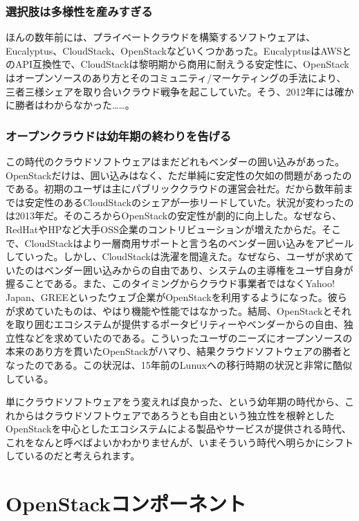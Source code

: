 \documentclass[9pt,b5paper,tombo,openany]{jsbook}
\begin{document}
\subsubsection{選択肢は多様性を産みすぎる}

ほんの数年前には、プライベートクラウドを構築するソフトウェアは、Eucalyptus、CloudStack、OpenStackなどいくつかあった。EucalyptusはAWSとのAPI互換性で、CloudStackは黎明期から商用に耐えうる安定性に、OpenStackはオープンソースのあり方とそのコミュニティ/マーケティングの手法により、三者三様シェアを取り合いクラウド戦争を起こしていた。そう、2012年には確かに勝者はわからなかった……。

\subsubsection{オープンクラウドは幼年期の終わりを告げる}

この時代のクラウドソフトウェアはまだどれもベンダーの囲い込みがあった。OpenStackだけは、囲い込みはなく、ただ単純に安定性の欠如の問題があったのである。初期のユーザは主にパブリッククラウドの運営会社だ。だから数年前までは安定性のあるCloudStackのシェアが一歩リードしていた。状況が変わったのは2013年だ。そのころからOpenStackの安定性が劇的に向上した。なぜなら、RedHatやHPなど大手OSS企業のコントリビューションが増えたからだ。そこで、CloudStackはより一層商用サポートと言う名のベンダー囲い込みをアピールしていった。しかし、CloudStackは洗濯を間違えた。なぜなら、ユーザが求めていたのはベンダー囲い込みからの自由であり、システムの主導権をユーザ自身が握ることである。また、このタイミングからクラウド事業者ではなくYahoo! Japan、GREEといったウェブ企業がOpenStackを利用するようになった。彼らが求めていたものは、やはり機能や性能ではなかった。結局、OpenStackとそれを取り囲むエコシステムが提供するポータビリティーやベンダーからの自由、独立性などを求めていたのである。こういったユーザのニーズにオープンソースの本来のあり方を貫いたOpenStackがハマり、結果クラウドソフトウェアの勝者となったのである。この状況は、15年前のLunuxへの移行時期の状況と非常に酷似している。

単にクラウドソフトウェアをう変えれば良かった、という幼年期の時代から、これからはクラウドソフトウェアであろうとも自由という独立性を根幹としたOpenStackを中心としたエコシステムによる製品やサービスが提供される時代、これをなんと呼べばよいかわかりませんが、いまそういう時代へ明らかにシフトしているのだと考えられます。

\section{OpenStackコンポーネント}
\end{document}
